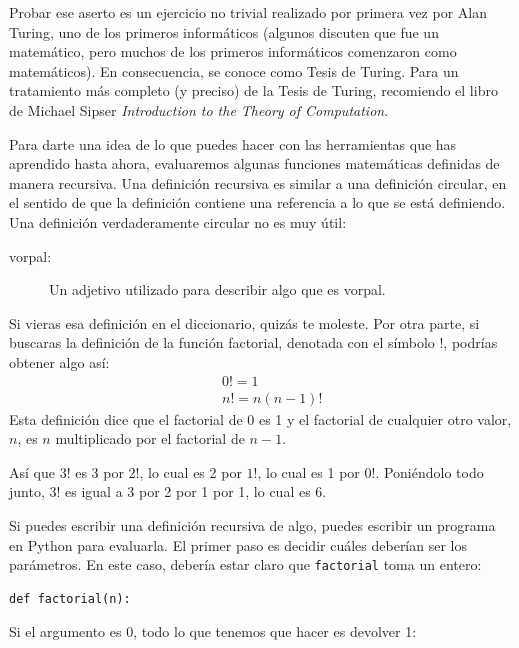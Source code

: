 \documentclass[10pt]{book}
\begin{document}
Probar ese aserto es un ejercicio no trivial realizado por primera vez por Alan
Turing, uno de los primeros informáticos (algunos discuten que
fue un matemático, pero muchos de los primeros informáticos comenzaron como
matemáticos).  En consecuencia, se conoce como Tesis de Turing.
Para un tratamiento más completo (y preciso) de la Tesis de Turing,
recomiendo el libro de Michael Sipser {\em Introduction to the
Theory of Computation}.

Para darte una idea de lo que puedes hacer con las herramientas que has aprendido
hasta ahora, evaluaremos algunas funciones matemáticas definidas de manera
recursiva.  Una definición recursiva es similar a una definición
circular, en el sentido de que la definición contiene una referencia a lo que
se está definiendo.  Una definición verdaderamente circular no es muy
útil:

\begin{description}

\item[vorpal:] Un adjetivo utilizado para describir algo que es vorpal.

\end{description}

Si vieras esa definición en el diccionario, quizás te moleste. Por
otra parte, si buscaras la definición de la función
factorial, denotada con el símbolo $!$, podrías obtener algo
así:
%
\begin{eqnarray*}
&&  0! = 1 \\
&&  n! = n (n-1)!
\end{eqnarray*}
%
Esta definición dice que el factorial de 0 es 1 y el factorial de
cualquier otro valor, $n$, es $n$ multiplicado por el factorial de $n-1$.

Así que $3!$ es 3 por $2!$, lo cual es 2 por $1!$, lo cual es 1 por
$0!$. Poniéndolo todo junto, $3!$ es igual a 3 por 2 por 1 por 1,
lo cual es 6.

Si puedes escribir una definición recursiva de algo, puedes
escribir un programa en Python para evaluarla.  El primer paso es decidir
cuáles deberían ser los parámetros.  En este caso, debería estar claro
que {\tt factorial} toma un entero:

\begin{verbatim}
def factorial(n):
\end{verbatim}
%
Si el argumento es 0, todo lo que tenemos que hacer es devolver 1:
\end{document}
